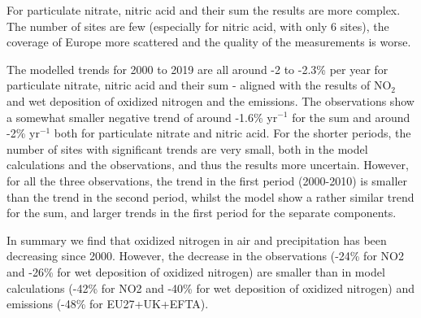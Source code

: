 For particulate nitrate, nitric acid and their sum the results are more complex. The number of sites are few (especially for nitric acid, with only 6 sites), the coverage of Europe more scattered and the quality of the measurements is worse. 

The modelled trends for 2000 to 2019 are all around -2 to -2.3\% per year for particulate nitrate, nitric acid and their sum - aligned with the results of NO$_2$ and wet deposition of oxidized nitrogen and the emissions. The observations show a somewhat smaller negative trend of around -1.6\% yr$^{-1}$ for the sum and around -2\% yr$^{-1}$ both for particulate nitrate and nitric acid. For the shorter periods, the number of sites with significant trends are very small, both in the model calculations and the observations, and thus the results more uncertain.
However, for all the three observations, the trend in the first period (2000-2010) is smaller than the trend in the second period, whilst the model show a rather similar trend for the sum, and larger trends in the first period for the separate components.

In summary we find that oxidized nitrogen in air and precipitation has been decreasing since 2000. However, the decrease in the observations (-24\% for NO2 and -26\% for wet deposition of oxidized nitrogen) are smaller than in model calculations (-42\% for NO2 and -40\% for wet deposition of oxidized nitrogen) and emissions (-48\% for EU27+UK+EFTA). 

